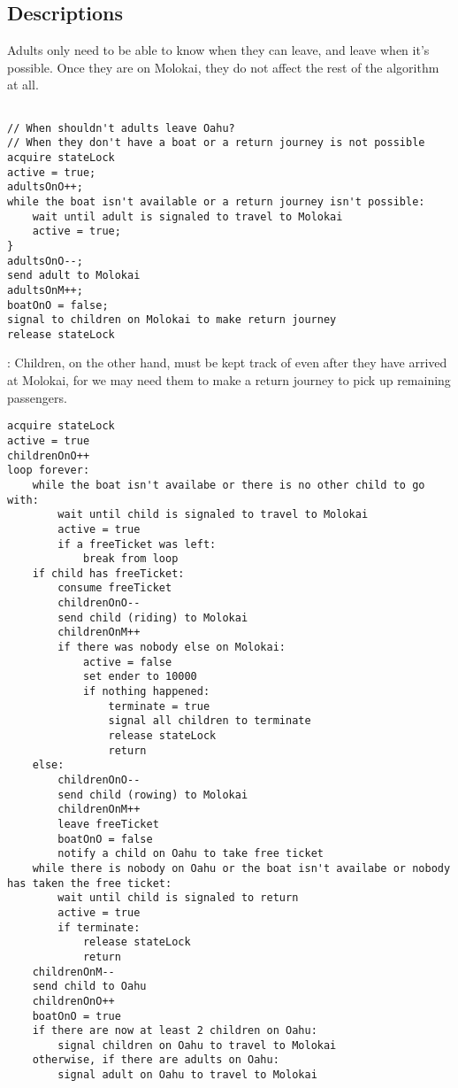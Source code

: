 \documentclass{article}
\begin{document}
\subsection{Descriptions} %
Adults only need to be able to know when they can leave, and leave when it's possible. Once they are on Molokai, they do not affect the rest of the algorithm at all.

\scriptsize
\begin{lstlisting}

// When shouldn't adults leave Oahu?
// When they don't have a boat or a return journey is not possible
acquire stateLock
active = true;
adultsOnO++;
while the boat isn't available or a return journey isn't possible:
    wait until adult is signaled to travel to Molokai
    active = true;
}
adultsOnO--;
send adult to Molokai
adultsOnM++;
boatOnO = false;
signal to children on Molokai to make return journey
release stateLock
\end{lstlisting}
\normalsize
:
Children, on the other hand, must be kept track of even after they have arrived at Molokai, for we may need them to make a return journey to pick up remaining passengers.

\scriptsize
\begin{lstlisting}
acquire stateLock
active = true
childrenOnO++
loop forever:
    while the boat isn't availabe or there is no other child to go with:
        wait until child is signaled to travel to Molokai
        active = true
        if a freeTicket was left:
            break from loop
    if child has freeTicket:
        consume freeTicket
        childrenOnO--
        send child (riding) to Molokai
        childrenOnM++
        if there was nobody else on Molokai:
            active = false
            set ender to 10000
            if nothing happened:
                terminate = true
                signal all children to terminate
                release stateLock
                return
    else:
        childrenOnO--
        send child (rowing) to Molokai
        childrenOnM++
        leave freeTicket
        boatOnO = false
        notify a child on Oahu to take free ticket
    while there is nobody on Oahu or the boat isn't availabe or nobody has taken the free ticket:
        wait until child is signaled to return
        active = true
        if terminate:
            release stateLock
            return
    childrenOnM--
    send child to Oahu
    childrenOnO++
    boatOnO = true
    if there are now at least 2 children on Oahu:
        signal children on Oahu to travel to Molokai
    otherwise, if there are adults on Oahu:
        signal adult on Oahu to travel to Molokai
\end{lstlisting}
\normalsize
\end{document}
